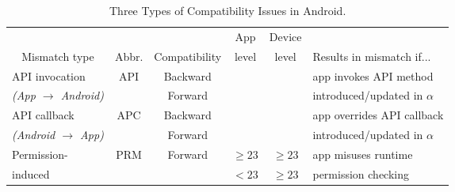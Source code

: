 \begin{table*}[tb]
\centering
\caption{Three Types of Compatibility Issues in Android. \label{tab:api-mismatch}}
\begin{tabular}{l|c|c|c|c|l}
    \toprule
    \multicolumn{1}{c}{}              &\multicolumn{1}{|c}{}    & \multicolumn{1}{|c}{}              & \multicolumn{1}{|c}{App}   & \multicolumn{1}{|c|}{Device}& \\
    \multicolumn{1}{c}{Mismatch type} &\multicolumn{1}{|c}{Abbr.}& \multicolumn{1}{|c}{Compatibility} & \multicolumn{1}{|c}{level} & \multicolumn{1}{|c|}{level} & Results in mismatch if... \\
    \toprule
    API invocation                    &API & Backward & \rlap{$\geq\alpha$}\phantom{$<23$} & \rlap{$<\alpha$}\phantom{$\geq23$}    &app invokes API method      \\
    {\it (App $\rightarrow$ Android)} &    & Forward  & \rlap{$<\alpha$}\phantom{$<23$}    & \rlap{$\geq\alpha$}\phantom{$\geq23$} &\mbox{}introduced/updated in $\alpha$ \\
    \midrule
    API callback                      &APC & Backward & \rlap{$\geq\alpha$}\phantom{$<23$} & \rlap{$<\alpha$}\phantom{$\geq23$}    &app overrides API callback  \\
    {\it (Android $\rightarrow$ App)} &    & Forward  & \rlap{$<\alpha$}\phantom{$<23$}    & \rlap{$\geq\alpha$}\phantom{$\geq23$} &\mbox{}introduced/updated in $\alpha$ \\
    \midrule  
    Permission-                       &PRM & \multirow{ 2}{*}{Forward} & $\geq23$                           & $\geq23$                              &app misuses runtime \\
    induced                            &    &    & $<23$                              & $\geq23$                              &\mbox{}permission checking          \\ 
    \bottomrule
\end{tabular}
\end{table*}
